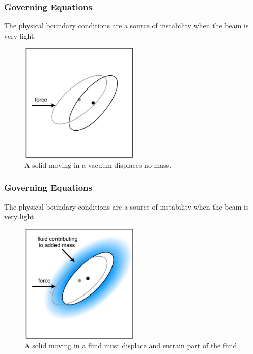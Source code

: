 \documentclass[8pt]{beamer}
\begin{document}
\begin{frame}
    \frametitle{Governing Equations}
    The physical boundary conditions are a source of instability when the beam
    is very light.

    \begin{figure}
        \centering
        \includegraphics[width=2.25in]{left.png}

        \caption{A solid moving in a vacuum displaces no mass.}
    \end{figure}
\end{frame}

\begin{frame}
    \frametitle{Governing Equations}
    The physical boundary conditions are a source of instability when the beam
    is very light.

    \begin{figure}
        \centering
        \includegraphics[width=2.25in]{right.png}

        \caption{A solid moving in a fluid must displace and entrain part of the
        fluid.}
    \end{figure}
\end{frame}
\end{document}
